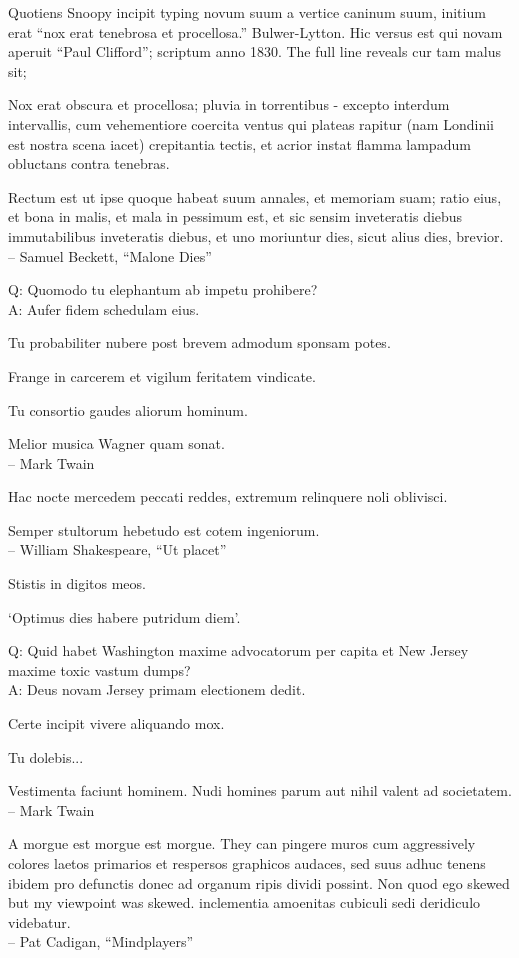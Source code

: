\documentclass[titlepage,12pt]{memoir}
\begin{document}
Quotiens Snoopy incipit typing novum suum a vertice caninum suum,
initium erat “nox erat tenebrosa et procellosa.”
Bulwer-Lytton. Hic versus est qui novam aperuit “Paul Clifford”;
scriptum anno 1830. The full line reveals cur tam malus sit;

Nox erat obscura et procellosa; pluvia in torrentibus - excepto
interdum intervallis, cum vehementiore coercita
ventus qui plateas rapitur (nam Londinii est nostra scena
iacet) crepitantia tectis, et acrior instat
flamma lampadum obluctans contra tenebras.

Rectum est ut ipse quoque habeat suum annales, et memoriam suam;
ratio eius, et bona in malis, et mala in
pessimum est, et sic sensim inveteratis diebus immutabilibus inveteratis diebus, et uno moriuntur
dies, sicut alius dies, brevior.
\\-- Samuel Beckett, “Malone Dies”

Q: Quomodo tu elephantum ab impetu prohibere?\\
A: Aufer fidem schedulam eius.

Tu probabiliter nubere post brevem admodum sponsam potes.

Frange in carcerem et vigilum feritatem vindicate.

Tu consortio gaudes aliorum hominum.

Melior musica Wagner quam sonat.
\\-- Mark Twain

 Hac nocte mercedem peccati reddes, extremum relinquere noli oblivisci.

Semper stultorum hebetudo est cotem ingeniorum.
\\-- William Shakespeare, “Ut placet”

Stistis in digitos meos.

‘Optimus dies habere putridum diem’.

Q: Quid habet Washington maxime advocatorum per capita et
New Jersey maxime toxic vastum dumps?\\
A: Deus novam Jersey primam electionem dedit.

Certe incipit vivere aliquando mox.

Tu dolebis...

Vestimenta faciunt hominem. Nudi homines parum aut nihil valent ad societatem.
\\-- Mark Twain

A morgue est morgue est morgue. They can pingere muros cum aggressively
colores laetos primarios et respersos graphicos audaces, sed suus adhuc tenens
ibidem pro defunctis donec ad organum ripis dividi possint. Non quod ego
skewed but my viewpoint was skewed. inclementia
amoenitas cubiculi sedi deridiculo videbatur.
\\-- Pat Cadigan, “Mindplayers”
\end{document}
